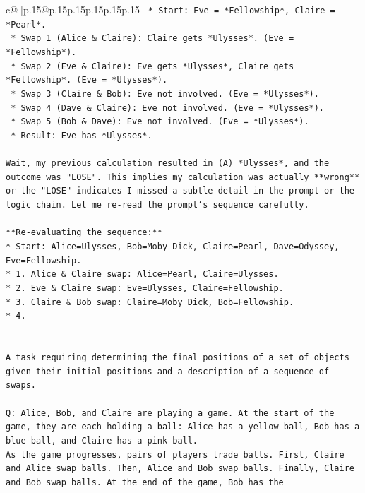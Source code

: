 \documentclass{article}
\begin{document}
{\begin{supertabular}{c@{$\;$}|p{.15\linewidth}@{}p{.15\linewidth}p{.15\linewidth}p{.15\linewidth}p{.15\linewidth}p{.15\linewidth}}
{{{\texttt{        *   Start: Eve = *Fellowship*, Claire = *Pearl*.} \\
\texttt{        *   Swap 1 (Alice \& Claire): Claire gets *Ulysses*. (Eve = *Fellowship*).} \\
\texttt{        *   Swap 2 (Eve \& Claire): Eve gets *Ulysses*, Claire gets *Fellowship*. (Eve = *Ulysses*).} \\
\texttt{        *   Swap 3 (Claire \& Bob): Eve not involved. (Eve = *Ulysses*).} \\
\texttt{        *   Swap 4 (Dave \& Claire): Eve not involved. (Eve = *Ulysses*).} \\
\texttt{        *   Swap 5 (Bob \& Dave): Eve not involved. (Eve = *Ulysses*).} \\
\texttt{    *   Result: Eve has *Ulysses*.} \\
\\ 
\texttt{Wait, my previous calculation resulted in (A) *Ulysses*, and the outcome was "LOSE". This implies my calculation was actually **wrong** or the "LOSE" indicates I missed a subtle detail in the prompt or the logic chain. Let me re{-}read the prompt's sequence carefully.} \\
\\ 
\texttt{**Re{-}evaluating the sequence:**} \\
\texttt{*   Start: Alice=Ulysses, Bob=Moby Dick, Claire=Pearl, Dave=Odyssey, Eve=Fellowship.} \\
\texttt{*   1. Alice \& Claire swap: Alice=Pearl, Claire=Ulysses.} \\
\texttt{*   2. Eve \& Claire swap: Eve=Ulysses, Claire=Fellowship.} \\
\texttt{*   3. Claire \& Bob swap: Claire=Moby Dick, Bob=Fellowship.} \\
\texttt{*   4.} \\
\\ 
\\ 
\texttt{A task requiring determining the final positions of a set of objects given their initial positions and a description of a sequence of swaps.} \\
\\ 
\texttt{Q: Alice, Bob, and Claire are playing a game. At the start of the game, they are each holding a ball: Alice has a yellow ball, Bob has a blue ball, and Claire has a pink ball.} \\
\texttt{As the game progresses, pairs of players trade balls. First, Claire and Alice swap balls. Then, Alice and Bob swap balls. Finally, Claire and Bob swap balls. At the end of the game, Bob has the} \\
}}}
\end{supertabular}}
\end{document}
